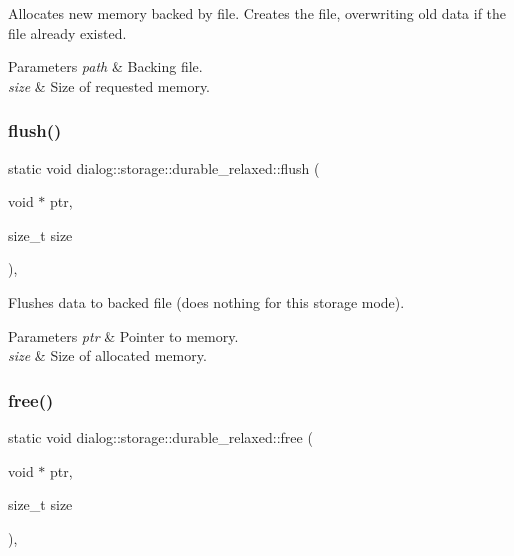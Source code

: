 Allocates new memory backed by file. Creates the file, overwriting old data if the file already existed.


\begin{DoxyParams}{Parameters}
{\em path} & Backing file. \\
\hline
{\em size} & Size of requested memory. \\
\hline
\end{DoxyParams}
\mbox{\label{structdialog_1_1storage_1_1durable__relaxed_a017593d30af37c9bb6df31c82dfbfcf5}} 
\subsubsection{\texorpdfstring{flush()}{flush()}}
{\footnotesize\ttfamily static void dialog\+::storage\+::durable\+\_\+relaxed\+::flush (\begin{DoxyParamCaption}\item[{void $\ast$}]{ptr,  }\item[{size\+\_\+t}]{size }\end{DoxyParamCaption})\hspace{0.3cm}{\ttfamily [inline]}, {\ttfamily [static]}}

Flushes data to backed file (does nothing for this storage mode).


\begin{DoxyParams}{Parameters}
{\em ptr} & Pointer to memory. \\
\hline
{\em size} & Size of allocated memory. \\
\hline
\end{DoxyParams}
\mbox{\label{structdialog_1_1storage_1_1durable__relaxed_a7eee32ffcf5bd7a8da913f3cc5747579}} 
\subsubsection{\texorpdfstring{free()}{free()}}
{\footnotesize\ttfamily static void dialog\+::storage\+::durable\+\_\+relaxed\+::free (\begin{DoxyParamCaption}\item[{void $\ast$}]{ptr,  }\item[{size\+\_\+t}]{size }\end{DoxyParamCaption})\hspace{0.3cm}{\ttfamily [inline]}, {\ttfamily [static]}}

